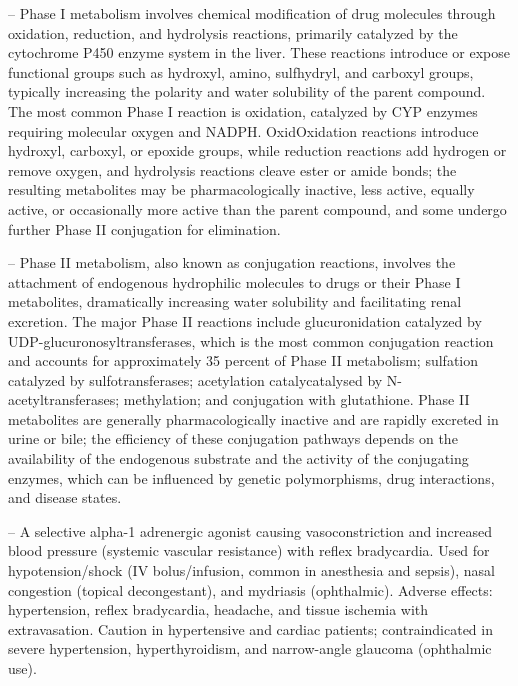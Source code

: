 -- Phase I metabolism involves chemical modification of drug molecules through oxidation, reduction, and hydrolysis reactions, primarily catalyzed by the cytochrome P450 enzyme system in the liver. These reactions introduce or expose functional groups such as hydroxyl, amino, sulfhydryl, and carboxyl groups, typically increasing the polarity and water solubility of the parent compound. The most common Phase I reaction is oxidation, catalyzed by CYP enzymes requiring molecular oxygen and NADPH. OxidOxidation reactions introduce hydroxyl, carboxyl, or epoxide groups, while reduction reactions add hydrogen or remove oxygen, and hydrolysis reactions cleave ester or amide bonds; the resulting metabolites may be pharmacologically inactive, less active, equally active, or occasionally more active than the parent compound, and some undergo further Phase II conjugation for elimination.

-- Phase II metabolism, also known as conjugation reactions, involves the attachment of endogenous hydrophilic molecules to drugs or their Phase I metabolites, dramatically increasing water solubility and facilitating renal excretion. The major Phase II reactions include glucuronidation catalyzed by UDP-glucuronosyltransferases, which is the most common conjugation reaction and accounts for approximately 35 percent of Phase II metabolism; sulfation catalyzed by sulfotransferases; acetylation catalycatalysed by N-acetyltransferases; methylation; and conjugation with glutathione. Phase II metabolites are generally pharmacologically inactive and are rapidly excreted in urine or bile; the efficiency of these conjugation pathways depends on the availability of the endogenous substrate and the activity of the conjugating enzymes, which can be influenced by genetic polymorphisms, drug interactions, and disease states.

-- A selective alpha-1 adrenergic agonist causing vasoconstriction and increased blood pressure (systemic vascular resistance) with reflex bradycardia. Used for hypotension/shock (IV bolus/infusion, common in anesthesia and sepsis), nasal congestion (topical decongestant), and mydriasis (ophthalmic). Adverse effects: hypertension, reflex bradycardia, headache, and tissue ischemia with extravasation. Caution in hypertensive and cardiac patients; contraindicated in severe hypertension, hyperthyroidism, and narrow-angle glaucoma (ophthalmic use).

